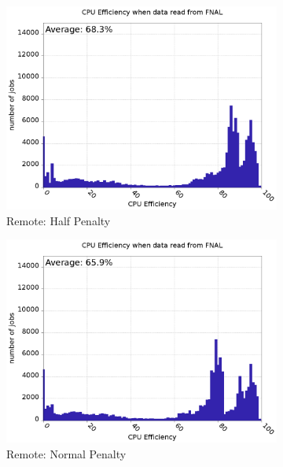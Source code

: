 \documentclass[a4paper]{jpconf}
\begin{document}
\begin{figure}
\begin{center}
\begin{subfigure}{0.3\textwidth}
      \includegraphics[width=\textwidth]{figures/F_FP0_RM1CPUEff.png}
      \caption{Remote: Half Penalty\label{fig:cpuEffRemoteH}}
    \end{subfigure}
    \begin{subfigure}{0.3\textwidth}
      \includegraphics[width=\textwidth]{figures/F_FP0_RP0CPUEff.png}
      \caption{Remote: Normal Penalty\label{fig:cpuEffRemoteN}}
    \end{subfigure}
    \begin{subfigure}{0.3\textwidth}

\end{subfigure}
\end{center}
\end{figure}
\end{document}
